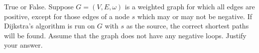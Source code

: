 \begin{prob}
    True or False. Suppose $G = (V, E, \omega)$ is a weighted graph for which
    all edges are positive, except for those edges of a node $s$ which may or
    may not be negative. If Dijkstra's algorithm is run on $G$ with $s$ as
    the source, the correct shortest paths will be found. Assume that the graph does not have any negative loops. Justify your answer.

    \begin{soln}
    \end{soln}
\end{prob}
